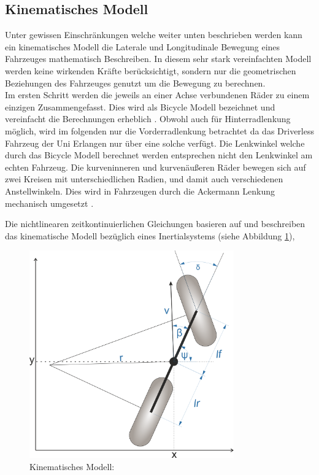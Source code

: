 \documentclass{like}
\begin{document}
\subsection{Kinematisches Modell}
\label{kinematicModel}
Unter gewissen Einschränkungen welche weiter unten beschrieben werden kann ein kinematisches Modell die Laterale und Longitudinale Bewegung eines Fahrzeuges mathematisch Beschreiben. In diesem sehr stark vereinfachten Modell werden keine wirkenden Kräfte berücksichtigt, sondern nur die geometrischen Beziehungen des Fahrzeuges genutzt um die Bewegung zu berechnen. \\
Im ersten Schritt werden die jeweils an einer Achse verbundenen Räder zu einem einzigen Zusammengefasst. Dies wird als Bicycle Modell bezeichnet und vereinfacht die Berechnungen erheblich \cite{BicycleModel}. Obwohl auch für Hinterradlenkung möglich, wird im folgenden nur die Vorderradlenkung betrachtet da das Driverless Fahrzeug der Uni Erlangen nur über eine solche verfügt. Die Lenkwinkel welche durch das Bicycle Modell berechnet werden entsprechen nicht den Lenkwinkel am echten Fahrzeug. Die kurveninneren und kurvenäußeren Räder bewegen sich auf zwei Kreisen mit unterschiedlichen Radien, und damit auch verschiedenen Anstellwinkeln. Dies wird in Fahrzeugen durch die Ackermann Lenkung mechanisch umgesetzt \cite{rajamani2011vehicle}.


Die nichtlinearen zeitkontinuierlichen Gleichungen basieren auf \cite{rajamani2011vehicle, 7225830} und beschreiben das kinematische Modell bezüglich eines Inertialsystems (siehe Abbildung \ref{fig:kinmodel}),

\begin{figure}[ht!]
	\centering
	\includegraphics[width=250pt]{Abbildungen/kinBicycle.png}
	\caption{Kinematisches Modell:}
	\label{fig:kinmodel}
\end{figure}
\end{document}
